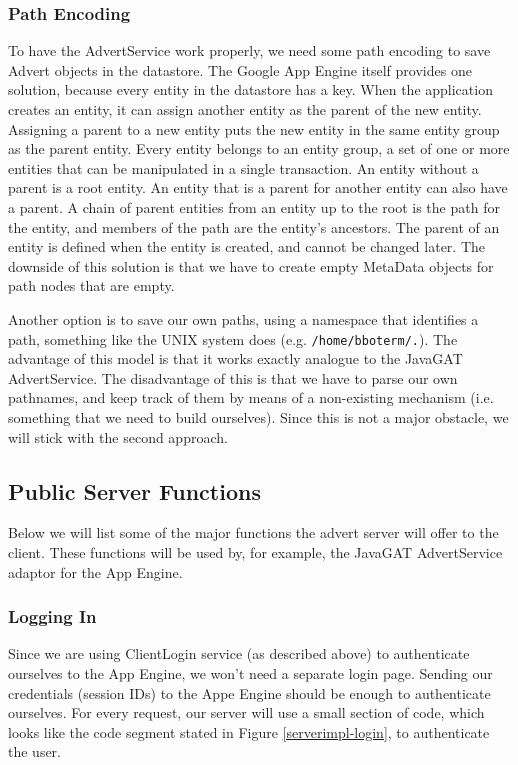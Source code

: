 \subsubsection{Path Encoding}
To have the AdvertService work properly, we need some path encoding to save
Advert objects in the datastore. The Google App Engine itself provides one
solution, because every entity in the datastore has a key. When the application
creates an entity, it can assign another entity as the parent of the new entity.
Assigning a parent to a new entity puts the new entity in the same entity group
as the parent entity. Every entity belongs to an entity group, a set of one or
more entities that can be manipulated in a single transaction. An entity without
a parent is a root entity. An entity that is a parent for another entity can also
have a parent. A chain of parent entities from an entity up to the root is the
path for the entity, and members of the path are the entity's ancestors. The
parent of an entity is defined when the entity is created, and cannot be changed
later. The downside of this solution is that we have to create empty MetaData
objects for path nodes that are empty.

Another option is to save our own paths, using a namespace that identifies a
path, something like the UNIX system does (e.g. \texttt{/home/bboterm/.}). The
advantage of this model is that it works exactly analogue to the JavaGAT
AdvertService. The disadvantage of this is that we have to parse our own
pathnames, and keep track of them by means of a non-existing mechanism (i.e.
something that we need to build ourselves). Since this is not a major obstacle,
we will stick with the second approach.

\subsection{Public Server Functions}
Below we will list some of the major functions the advert server will offer to
the client. These functions will be used by, for example, the JavaGAT
AdvertService adaptor for the App Engine.

\subsubsection{Logging In}
Since we are using ClientLogin service (as described above) to authenticate
ourselves to the App Engine, we won't need a separate login page. Sending our
credentials (session IDs) to the Appe Engine should be enough to authenticate
ourselves. For every request, our server will use a small section of code, which
looks like the code segment stated in Figure \ref{serverimpl-login}, to
authenticate the user.

